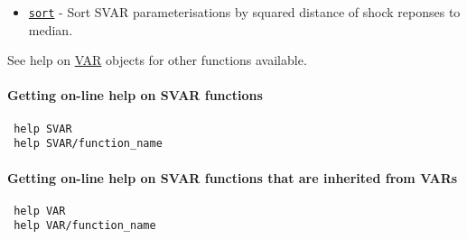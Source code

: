 \begin{itemize}
 \item
   \href{SVAR/sort}{\texttt{sort}} - Sort SVAR parameterisations by
   squared distance of shock reponses to median.
 \end{itemize}
 
 See help on \href{VAR/Contents}{VAR} objects for other functions
 available.
 
 \paragraph{Getting on-line help on SVAR functions}
 
 \begin{verbatim}
 help SVAR
 help SVAR/function_name
 \end{verbatim}
 
 \paragraph{Getting on-line help on SVAR functions that are inherited
 from VARs}
 
 \begin{verbatim}
 help VAR
 help VAR/function_name
 \end{verbatim}



